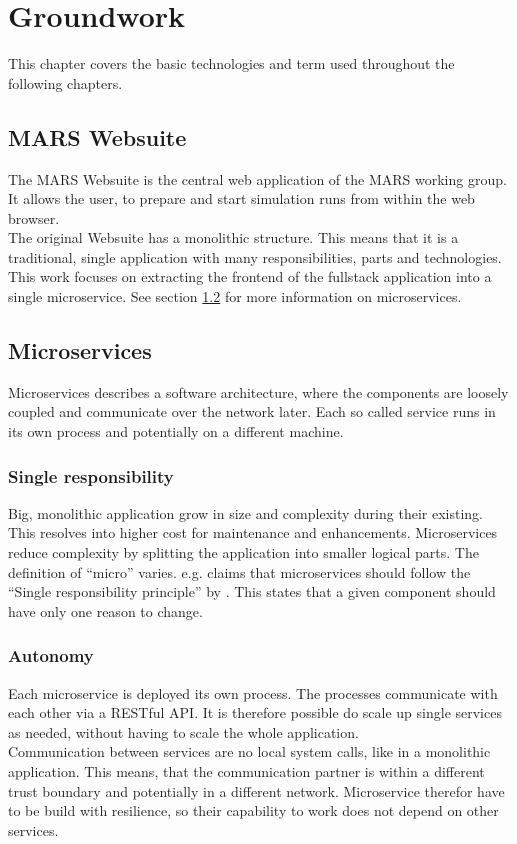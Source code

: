 
\chapter{Groundwork}
This chapter covers the basic technologies and term used throughout the following chapters.



\section{MARS Websuite}
The MARS Websuite is the central web application of the MARS working group. It allows the user, to prepare and start simulation runs from within the web browser.\\
The original Websuite has a monolithic structure. This means that it is a traditional, single application with many responsibilities, parts and technologies.\\
This work focuses on extracting the frontend of the fullstack application into a single microservice. See section \ref{sec:microservices} for more information on microservices.\\



\section{Microservices}
\label{sec:microservices}
Microservices describes a software architecture, where the components are loosely coupled and communicate over the network later. Each so called service runs in its own process and potentially on a different machine.


\subsection{Single responsibility}
Big, monolithic application grow in size and complexity during their existing. This resolves into higher cost for maintenance and enhancements. Microservices reduce complexity by splitting the application into smaller logical parts. The definition of \enquote{micro} varies. \cite{newman2015building} e.g. claims that microservices should follow the \enquote{Single responsibility principle} by \cite{martin2003agile}. This states that a given component should have only one reason to change.


\subsection{Autonomy}
Each microservice is deployed its own process. The processes communicate with each other via a RESTful API. It is therefore possible do scale up single services as needed, without having to scale the whole application.\\
Communication between services are no local system calls, like in a monolithic application. This means, that the communication partner is within a different trust boundary and potentially in a different network. Microservice therefor have to be build with resilience, so their capability to work does not depend on other services.


